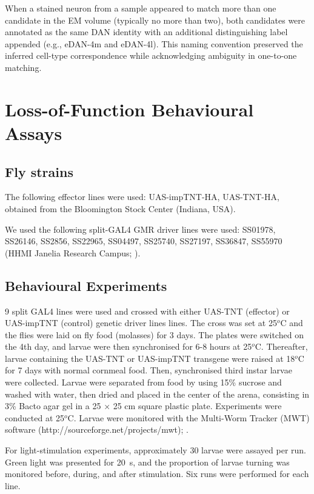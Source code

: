     When a stained neuron from a sample appeared to match more than one candidate in the EM volume (typically no more than two), both candidates were annotated as the same DAN identity with an additional distinguishing label appended (e.g., eDAN-4m and eDAN-4l). This naming convention preserved the inferred cell-type correspondence while acknowledging ambiguity in one-to-one matching.

\section{Loss-of-Function Behavioural Assays}

    \subsection{Fly strains}
    The following effector lines were used: UAS-impTNT-HA, UAS-TNT-HA, obtained from the Bloomington Stock Center (Indiana, USA).

    We used the following split-GAL4 GMR driver lines were used: SS01978, SS26146, SS2856, SS22965, SS04497, SS25740, SS27197, SS36847, SS55970 (HHMI Janelia Research Campus; \citep{li2014gal4, meissner2025splitgal4}). 
    
    \subsection{Behavioural Experiments}

    9 split GAL4 lines were used and crossed with either UAS-TNT (effector) or UAS-impTNT (control) genetic driver lines lines.
    The cross was set at 25$^o$C and the flies were laid on fly food (molasses) for 3 days. The plates were switched on the 4th day, and larvae were then synchronised for 6-8 hours at 25$^o$C. Thereafter, larvae containing the UAS-TNT or UAS-impTNT transgene were raised at 18$^o$C for 7 days with normal cornmeal food. Then, synchronised third instar larvae were collected. 
    Larvae were separated from food by using 15\% sucrose and washed with water, then dried and placed in the center of the arena, consisting in 3\% Bacto agar gel in a 25 × 25 cm square plastic plate.
    Experiments were conducted at 25$^o$C.
    Larvae were monitored with the Multi-Worm Tracker (MWT) software (http://sourceforge.net/projects/mwt); \citep{Ohyama2013PlosONE}.

    For light-stimulation experiments, approximately 30 larvae were assayed per run. Green light was presented for 20~s, and the proportion of larvae turning was monitored before, during, and after stimulation. Six runs were performed for each line.

